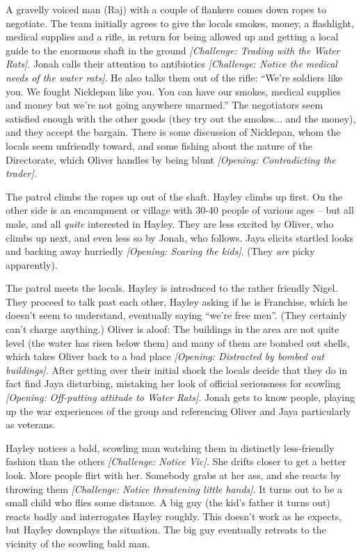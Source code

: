 A gravelly voiced man (Raj) with a couple of flankers comes down ropes to negotiate.  The team initially agrees to give the locals smokes, money, a flashlight, medical supplies and a rifle, in return for being allowed up and getting a local guide to the enormous shaft in the ground\textit{ {[}Challenge: Trading with the Water Rats{]}}. Jonah calls their attention to antibiotics\textit{ {[}Challenge: Notice the medical needs of the water rats{]}}. He also talks them out of the rifle: ``We're soldiers like you.  We fought Nicklepan like you.   You can have our smokes, medical supplies and money but we're not going anywhere unarmed.''  The negotiators seem satisfied enough with the other goods (they try out the smokes... and the money), and they accept the bargain.  There is some discussion of Nicklepan, whom the locals seem unfriendly toward, and some fishing about the nature of the Directorate, which Oliver handles by being blunt\textit{ {[}Opening: Contradicting the trader{]}.}



The patrol climbs the ropes up out of the shaft.  Hayley climbs up first.  On the other side is an encampment or village with 30-40 people of various ages – but all male, and all\textit{ quite} interested in Hayley.  They are less excited by Oliver, who climbs up next, and even less so by Jonah, who follows.  Jaya elicits startled looks and backing away hurriedly\textit{ {[}Opening: Scaring the kids{]}}.  (They \textit{are} picky apparently).



The patrol meets the locals.  Hayley is introduced to the rather friendly Nigel.  They proceed to talk past each other, Hayley asking if he is Franchise, which he doesn't seem to understand, eventually saying ``we're free men''.  (They certainly can't charge anything.)  Oliver is aloof: The buildings in the area are not quite level (the water has risen below them) and many of them are bombed out shells, which takes Oliver back to a bad place\textit{ {[}Opening: Distracted by bombed out buildings{]}}.  After getting over their initial shock the locals decide that they do in fact find Jaya disturbing, mistaking her look of official seriousness for scowling\textit{ {[}Opening: Off-putting attitude to Water Rats{]}}.  Jonah gets to know people, playing up the war experiences of the group and referencing Oliver and Jaya particularly as veterans.



Hayley notices a bald, scowling man watching them in distinctly less-friendly fashion than the others \textit{{[}Challenge: Notice Vic{]}.  }She drifts closer to get a better look.  More people flirt with her.   Somebody grabs at her ass, and she reacts by throwing them\textit{ {[}Challenge: Notice threatening little hands{]}}.  It turns out to be a small child who flies some distance.  A big guy (the kid's father it turns out) reacts badly and interrogates Hayley roughly.  This doesn't work as he expects, but Hayley downplays the situation.  The big guy eventually retreats to the vicinity of the scowling bald man.



